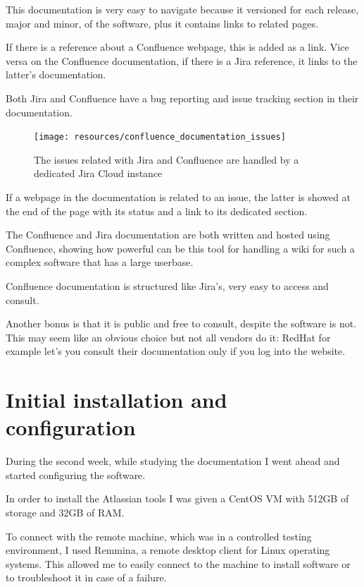 	This documentation is very easy to navigate because it versioned for each release, major and minor, of the software, plus it contains links to related pages.
	
	If there is a reference about a Confluence webpage, this is added as a link.
	Vice versa on the Confluence documentation, if there is a Jira reference, it links to the latter's documentation.
	
	Both Jira and Confluence have a bug reporting and issue tracking section in their documentation.
	\begin{figure}[H]
		\centering
		\texttt{[image: resources/confluence\_documentation\_issues]}\\
		\caption{The issues related with Jira and Confluence are handled by a dedicated Jira Cloud instance}
	\end{figure}
	
	If a webpage in the documentation is related to an issue, the latter is showed at the end of the page with its status and a link to its dedicated section.
	
	The Confluence and Jira documentation are both written and hosted using Confluence, showing how powerful can be this tool for handling a wiki for such a complex software that has a large userbase.
	
	Confluence documentation is structured like Jira's, very easy to access and consult.
	
	Another bonus is that it is public and free to consult, despite the software is not.
	This may seem like an obvious choice but not all vendors do it: RedHat for example let's you consult their documentation only if you log into the website.
	
\section{Initial installation and configuration}
	
	During the second week, while studying the documentation I went ahead and started configuring the software.

	In order to install the Atlassian tools I was given a CentOS VM with 512GB of storage and 32GB of RAM.
		
	
	To connect with the remote machine, which was in a controlled testing environment, I used Remmina, a remote desktop client for Linux operating systems.
	This allowed me to easily connect to the machine to install software or to troubleshoot it in case of a failure.
	
